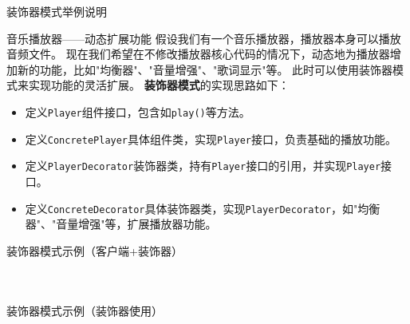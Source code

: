 \documentclass[UTF8,aspectratio=169]{beamer}
\begin{document}
\begin{frame}{装饰器模式举例说明}
    \begin{exampleytublock}{音乐播放器——动态扩展功能}
        假设我们有一个音乐播放器，播放器本身可以播放音频文件。
        现在我们希望在不修改播放器核心代码的情况下，动态地为播放器增加新的功能，比如"均衡器"、"音量增强"、"歌词显示"等。
        此时可以使用装饰器模式来实现功能的灵活扩展。
        \textbf{装饰器模式}的实现思路如下：
        \begin{itemize}
            \item 定义\texttt{Player}组件接口，包含如\texttt{play()}等方法。
            \item 定义\texttt{ConcretePlayer}具体组件类，实现\texttt{Player}接口，负责基础的播放功能。
            \item 定义\texttt{PlayerDecorator}装饰器类，持有\texttt{Player}接口的引用，并实现\texttt{Player}接口。
            \item 定义\texttt{ConcreteDecorator}具体装饰器类，实现\texttt{PlayerDecorator}，如"均衡器"、"音量增强"等，扩展播放器功能。
        \end{itemize}
    \end{exampleytublock}
\end{frame}

\begin{frame}{装饰器模式示例（客户端+装饰器）}
    \begin{columns}
        \begin{column}{0.48\textwidth}
            \inputminted[firstline=1, lastline=18]{cpp}{code/decorator_pattern.cpp}
        \end{column}
        \begin{column}{0.48\textwidth}
            \inputminted[firstline=20, lastline=36]{cpp}{code/decorator_pattern.cpp}
        \end{column}
    \end{columns}
\end{frame}

\begin{frame}{装饰器模式示例（装饰器使用）}
    \begin{columns}
        \begin{column}{0.48\textwidth}
            \inputminted[firstline=38, lastline=55]{cpp}{code/decorator_pattern.cpp}
        \end{column}
        \begin{column}{0.48\textwidth}
            \inputminted[firstline=67, lastline=77]{cpp}{code/decorator_pattern.cpp}
        \end{column}
    \end{columns}
\end{frame}
\end{document}
